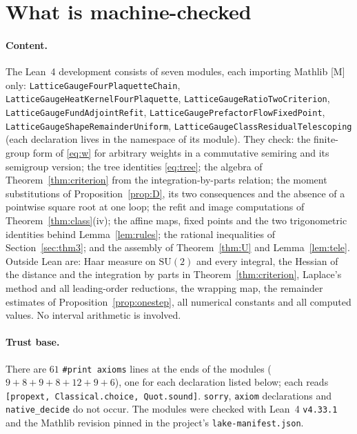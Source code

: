 \documentclass[11pt,a4paper]{article}
\theoremstyle{definition}
\theoremstyle{remark}
\newcommand{\SU}{\mathrm{SU}(2)}
\newcommand{\code}[1]{\texttt{#1}}
\begin{document}
\section{What is machine-checked}\label{sec:lean}
\sloppy

\paragraph{Content.}
The Lean~4 development consists of seven modules, each importing Mathlib [M] only: \code{LatticeGaugeFourPlaquetteChain}, \code{LatticeGaugeHeatKernelFourPlaquette}, \code{LatticeGaugeRatioTwoCriterion}, \code{LatticeGaugeFundAdjointRefit}, \code{LatticeGaugePrefactorFlowFixedPoint}, \code{LatticeGaugeShapeRemainderUniform}, \code{LatticeGaugeClassResidualTelescoping} (each declaration lives in the namespace of its module).
They check: the finite-group form of \eqref{eq:w} for arbitrary weights in a commutative semiring and its semigroup version; the tree identities \eqref{eq:tree}; the algebra of Theorem~\ref{thm:criterion} from the integration-by-parts relation; the moment substitutions of Proposition~\ref{prop:D}, its two consequences and the absence of a pointwise square root at one loop; the refit and image computations of Theorem~\ref{thm:class}(iv); the affine maps, fixed points and the two trigonometric identities behind Lemma~\ref{lem:rules}; the rational inequalities of Section~\ref{sec:thm3}; and the assembly of Theorem~\ref{thm:U} and Lemma~\ref{lem:tele}.
Outside Lean are: Haar measure on $\SU$ and every integral, the Hessian of the distance and the integration by parts in Theorem~\ref{thm:criterion}, Laplace's method and all leading-order reductions, the wrapping map, the remainder estimates of Proposition~\ref{prop:onestep}, all numerical constants and all computed values.
No interval arithmetic is involved.

\paragraph{Trust base.}
There are $61$ \code{\#print axioms} lines at the ends of the modules ($9+8+9+8+12+9+6$), one for each declaration listed below; each reads \code{[propext, Classical.choice, Quot.sound]}.
\code{sorry}, \code{axiom} declarations and \code{native\_decide} do not occur.
The modules were checked with Lean~4 \code{v4.33.1} and the Mathlib revision pinned in the project's \code{lake-\allowbreak{}manifest.json}.
\end{document}
